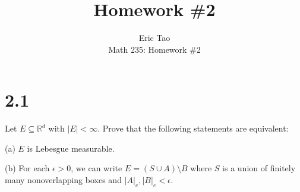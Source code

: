\documentclass[10pt]{article}
\newenvironment{problem}[2][Problem]{\begin{trivlist}
\item[\hskip \labelsep {\bfseries #1}\hskip \labelsep {\bfseries #2.}]}{\end{trivlist}}
\begin{document}
 
\title{Homework \#2}
\author{Eric Tao\\
Math 235: Homework \#2}
\maketitle
 
\section*{2.1}

\begin{problem}{2.2.38}

Let $E \subseteq \mathbb{R}^d$ with $|E| < \infty$. Prove that the following statements are equivalent:

(a) $E$ is Lebesgue measurable.

(b) For each $\epsilon > 0$, we can write $E = (S \cup A) \setminus B$ where $S$ is a union of finitely many nonoverlapping boxes and $|A|_e, |B|_e < \epsilon$.

\end{problem}
\end{document}
